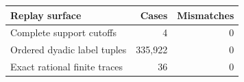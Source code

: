 \begin{tabular}{@{}lrr@{}}
\toprule
Replay surface & Cases & Mismatches \\
\midrule
Complete support cutoffs & 4 & 0 \\
Ordered dyadic label tuples & 335,922 & 0 \\
Exact rational finite traces & 36 & 0 \\
\bottomrule
\end{tabular}
